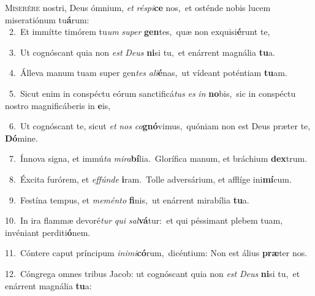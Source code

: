 \lettrine{\initial\textcolor{\initialcolor}{M}}{iserére} nostri, Deus ómnium, \textit{et} \textit{ré}\-\textit{spi}\textbf{ce} nos,~\star et osténde nobis lucem miseratiónum tu\-\textbf{á}\-rum:\\
{\numbfont\textcolor{\numbcolor}{~2.}}~Et immítte timórem tu\textit{um} \textit{su}\-\textit{per} \textbf{gen}\-tes,~\star quæ non exquisi\-\textbf{é}\-runt te,\par
{\numbfont\textcolor{\numbcolor}{~3.}}~Ut cognóscant quia non \textit{est} \textit{De}\-\textit{us} \textbf{ni}\-si tu,~\star et enárrent magnália \textbf{tu}\-a.\par
{\numbfont\textcolor{\numbcolor}{~4.}}~Álleva manum tuam super gen\textit{tes} \textit{a}\-\textit{li}\textbf{é}nas,~\star ut vídeant poténtiam \textbf{tu}\-am.\par
{\numbfont\textcolor{\numbcolor}{~5.}}~Sicut enim in conspéctu eórum sanctificá\textit{tus} \textit{es} \textit{in} \textbf{no}\-bis,~\star sic in conspéctu nostro magnificáberis in \textbf{e}\-is,\par
{\numbfont\textcolor{\numbcolor}{~6.}}~Ut cognóscant te, sicut \textit{et} \textit{nos} \textit{co}\-\textbf{gnó}vimus,~\star quóniam non est Deus præter te, \textbf{Dó}\-mine.\par
{\numbfont\textcolor{\numbcolor}{~7.}}~Ínnova signa, et immú\textit{ta} \textit{mi}\-\textit{ra}\textbf{bí}lia.~\star Glorífica manum, et bráchium \textbf{dex}\-trum.\par
{\numbfont\textcolor{\numbcolor}{~8.}}~Éxcita furórem, et \textit{ef}\-\textit{fún}\textit{de} \textbf{i}\-ram.~\star Tolle adversárium, et afflíge ini\-\textbf{mí}\-cum.\par
{\numbfont\textcolor{\numbcolor}{~9.}}~Festína tempus, et \textit{me}\-\textit{mén}\textit{to} \textbf{fi}\-nis,~\star ut enárrent mirabília \textbf{tu}\-a.\par
{\numbfont\textcolor{\numbcolor}{10.}}~In ira flammæ devoré\textit{tur} \textit{qui} \textit{sal}\-\textbf{vá}tur:~\star et qui péssimant plebem tuam, invéniant perditi\-\textbf{ó}\-nem.\par
{\numbfont\textcolor{\numbcolor}{11.}}~Cóntere caput príncipum \textit{in}\-\textit{i}\textit{mi}\textbf{có}rum,~\star dicéntium: Non est álius \textbf{præ}\-ter nos.\par
{\numbfont\textcolor{\numbcolor}{12.}}~Cóngrega omnes tribus Jacob: ut cognóscant quia non \textit{est} \textit{De}\-\textit{us} \textbf{ni}\-si tu,~\star et enárrent magnália \textbf{tu}\-a:\par
